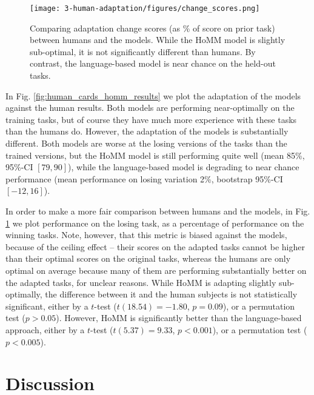 \begin{figure}
\centering
\texttt{[image: 3-human-adaptation/figures/change\_scores.png]}
\caption[Comparing adaptation change scores between the humans and models.]{Comparing adaptation change scores (as \% of score on prior task) between humans and the models. While the HoMM model is slightly sub-optimal, it is not significantly different than humans. By contrast, the language-based model is near chance on the held-out tasks.} \label{fig:human_cards_homm_change_scores}
\end{figure}
In Fig. \ref{fig:human_cards_homm_results} we plot the adaptation of the models against the human results. Both models are performing near-optimally on the training tasks, but of course they have much more experience with these tasks than the humans do. However, the adaptation of the models is substantially different. Both models are worse at the losing versions of the tasks than the trained versions, but the HoMM model is still performing quite well (mean 85\%, 95\%-CI \([79, 90]\)), while the language-based model is degrading to near chance performance (mean performance on losing variation 2\%, bootstrap 95\%-CI \([-12, 16]\)). \par
In order to make a more fair comparison between humans and the models, in Fig. \ref{fig:human_cards_homm_change_scores} we plot performance on the losing task, as a percentage of performance on the winning tasks. Note, however, that this metric is biased against the models, because of the ceiling effect -- their scores on the adapted tasks cannot be higher than their optimal scores on the original tasks, whereas the humans are only optimal on average because many of them are performing substantially better on the adapted tasks, for unclear reasons. While HoMM is adapting slightly sub-optimally, the difference between it and the human subjects is not statistically significant, either by a \(t\)-test (\(t(18.54) = -1.80\), \(p = 0.09\)), or a permutation test (\(p > 0.05\)). However, HoMM is significantly better than the language-based approach, either by a   \(t\)-test (\(t(5.37) = 9.33\), \(p < 0.001\)), or a permutation test (\(p < 0.005\)). \par

\section{Discussion}

